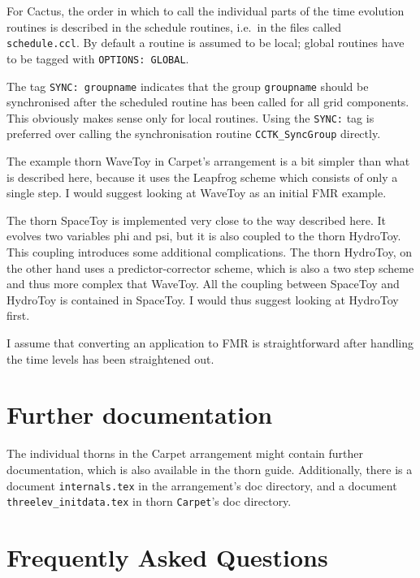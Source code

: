 For Cactus, the order in which to call the individual parts of the
time evolution routines is described in the schedule routines, i.e.\
in the files called \texttt{schedule.ccl}.  By default a routine is
assumed to be local; global routines have to be tagged with
\texttt{OPTIONS: GLOBAL}.

The tag \texttt{SYNC: groupname} indicates that the group
\texttt{groupname} should be synchronised after the scheduled routine
has been called for all grid components.  This obviously makes sense
only for local routines.  Using the \texttt{SYNC:} tag is preferred
over calling the synchronisation routine \texttt{CCTK\_SyncGroup}
directly.

The example thorn WaveToy in Carpet's arrangement is a bit simpler
than what is described here, because it uses the Leapfrog scheme which
consists of only a single step.  I would suggest looking at WaveToy as
an initial FMR example.

The thorn SpaceToy is implemented very close to the way described
here.  It evolves two variables phi and psi, but it is also coupled to
the thorn HydroToy.  This coupling introduces some additional
complications.  The thorn HydroToy, on the other hand uses a
predictor-corrector scheme, which is also a two step scheme and thus
more complex that WaveToy.  All the coupling between SpaceToy and
HydroToy is contained in SpaceToy.  I would thus suggest looking at
HydroToy first.

I assume that converting an application to FMR is straightforward
after handling the time levels has been straightened out.



\section{Further documentation}

The individual thorns in the Carpet arrangement might contain further
documentation, which is also available in the thorn guide.
Additionally, there is a document \texttt{internals.tex} in the
arrangement's doc directory, and a document
\texttt{threelev\_initdata.tex} in thorn \texttt{Carpet}'s doc
directory.


\section{Frequently Asked Questions}
\label{sec:faq}

